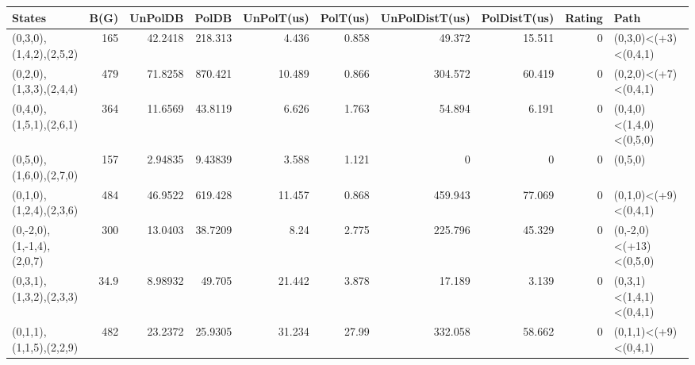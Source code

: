 \begin{tabular}{lrrrrrrrrl}
\hline
 States                    &   B(G) &   UnPolDB &     PolDB &   UnPolT(us) &   PolT(us) &   UnPolDistT(us) &   PolDistT(us) &   Rating & Path                    \\
\hline
 (0,3,0),(1,4,2),(2,5,2)   &  165   &  42.2418  & 218.313   &        4.436 &      0.858 &           49.372 &         15.511 &        0 & (0,3,0)<(+3)<(0,4,1)    \\
 (0,2,0),(1,3,3),(2,4,4)   &  479   &  71.8258  & 870.421   &       10.489 &      0.866 &          304.572 &         60.419 &        0 & (0,2,0)<(+7)<(0,4,1)    \\
 (0,4,0),(1,5,1),(2,6,1)   &  364   &  11.6569  &  43.8119  &        6.626 &      1.763 &           54.894 &          6.191 &        0 & (0,4,0)<(1,4,0)<(0,5,0) \\
 (0,5,0),(1,6,0),(2,7,0)   &  157   &   2.94835 &   9.43839 &        3.588 &      1.121 &            0     &          0     &        0 & (0,5,0)                 \\
 (0,1,0),(1,2,4),(2,3,6)   &  484   &  46.9522  & 619.428   &       11.457 &      0.868 &          459.943 &         77.069 &        0 & (0,1,0)<(+9)<(0,4,1)    \\
 (0,-2,0),(1,-1,4),(2,0,7) &  300   &  13.0403  &  38.7209  &        8.24  &      2.775 &          225.796 &         45.329 &        0 & (0,-2,0)<(+13)<(0,5,0)  \\
 (0,3,1),(1,3,2),(2,3,3)   &   34.9 &   8.98932 &  49.705   &       21.442 &      3.878 &           17.189 &          3.139 &        0 & (0,3,1)<(1,4,1)<(0,4,1) \\
 (0,1,1),(1,1,5),(2,2,9)   &  482   &  23.2372  &  25.9305  &       31.234 &     27.99  &          332.058 &         58.662 &        0 & (0,1,1)<(+9)<(0,4,1)    \\
\hline
\end{tabular}